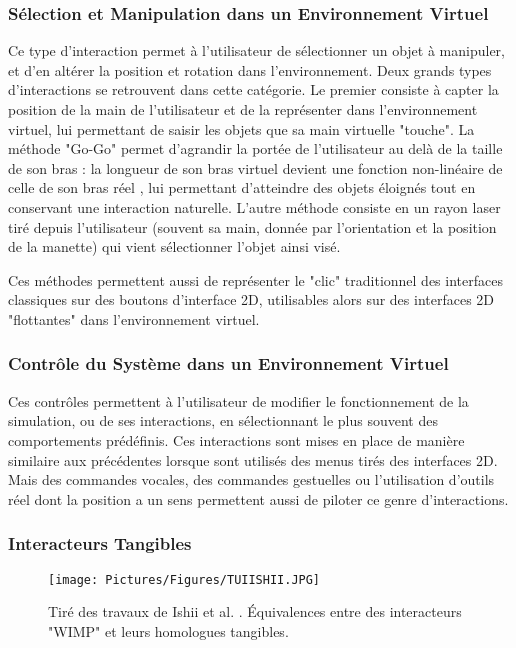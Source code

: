 	\subsubsection{Sélection et Manipulation dans un Environnement Virtuel}
	Ce type d'interaction permet à l'utilisateur de sélectionner un objet à manipuler, et d'en altérer la position et rotation dans l'environnement. Deux grands types d'interactions se retrouvent dans cette catégorie. Le premier consiste à capter la position de la main de l'utilisateur et de la représenter dans l'environnement virtuel, lui permettant de saisir les objets que sa main virtuelle "touche". La méthode "Go-Go" permet d'agrandir la portée de l'utilisateur au delà de la taille de son bras : la longueur de son bras virtuel devient une fonction non-linéaire de celle de son bras réel \cite{poupyrev_go-go_1996}, lui permettant d'atteindre des objets éloignés tout en conservant une interaction naturelle. L'autre méthode consiste en un rayon laser tiré depuis l'utilisateur (souvent sa main, donnée par l'orientation et la position de la manette) qui vient sélectionner l'objet ainsi visé. 
	
	Ces méthodes permettent aussi de représenter le "clic" traditionnel des interfaces classiques sur des boutons d'interface 2D, utilisables alors sur des interfaces 2D "flottantes" dans l'environnement virtuel.
	
	\subsubsection{Contrôle du Système dans un Environnement Virtuel}
	Ces contrôles permettent à l'utilisateur de modifier le fonctionnement de la simulation, ou de ses interactions, en sélectionnant le plus souvent des comportements prédéfinis. Ces interactions sont mises en place de manière similaire aux précédentes lorsque sont utilisés des menus tirés des interfaces 2D. Mais des commandes vocales, des commandes gestuelles ou l'utilisation d'outils réel dont la position a un sens permettent aussi de piloter ce genre d'interactions.
	
	
	\subsubsection{Interacteurs Tangibles}
	
		\begin{figure}
			\centering
			\texttt{[image: Pictures/Figures/TUIISHII.JPG]}
			\caption{Tiré des travaux de Ishii et al. \cite{ishii_tangible_1997}. Équivalences entre des interacteurs "WIMP" et leurs homologues tangibles.}
			\label{TUIEx}
		\end{figure}	
	
